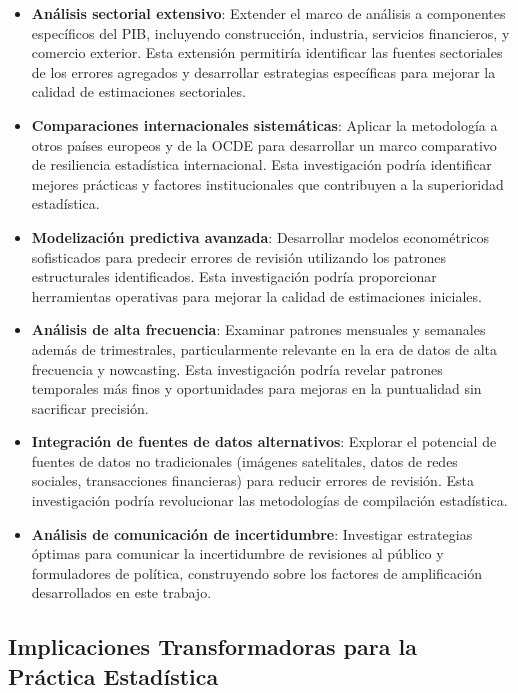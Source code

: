 \documentclass[12pt,a4paper]{article}
\begin{document}
\begin{itemize}
\item \textbf{Análisis sectorial extensivo}: Extender el marco de análisis a componentes específicos del PIB, incluyendo construcción, industria, servicios financieros, y comercio exterior. Esta extensión permitiría identificar las fuentes sectoriales de los errores agregados y desarrollar estrategias específicas para mejorar la calidad de estimaciones sectoriales.

\item \textbf{Comparaciones internacionales sistemáticas}: Aplicar la metodología a otros países europeos y de la OCDE para desarrollar un marco comparativo de resiliencia estadística internacional. Esta investigación podría identificar mejores prácticas y factores institucionales que contribuyen a la superioridad estadística.

\item \textbf{Modelización predictiva avanzada}: Desarrollar modelos econométricos sofisticados para predecir errores de revisión utilizando los patrones estructurales identificados. Esta investigación podría proporcionar herramientas operativas para mejorar la calidad de estimaciones iniciales.

\item \textbf{Análisis de alta frecuencia}: Examinar patrones mensuales y semanales además de trimestrales, particularmente relevante en la era de datos de alta frecuencia y nowcasting. Esta investigación podría revelar patrones temporales más finos y oportunidades para mejoras en la puntualidad sin sacrificar precisión.

\item \textbf{Integración de fuentes de datos alternativos}: Explorar el potencial de fuentes de datos no tradicionales (imágenes satelitales, datos de redes sociales, transacciones financieras) para reducir errores de revisión. Esta investigación podría revolucionar las metodologías de compilación estadística.

\item \textbf{Análisis de comunicación de incertidumbre}: Investigar estrategias óptimas para comunicar la incertidumbre de revisiones al público y formuladores de política, construyendo sobre los factores de amplificación desarrollados en este trabajo.
\end{itemize}

\subsection{Implicaciones Transformadoras para la Práctica Estadística}
\end{document}
